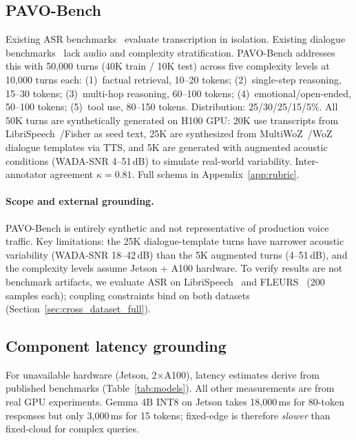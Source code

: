 \documentclass{article}
\begin{document}
\subsection{PAVO-Bench}
\label{sec:dataset}

Existing ASR benchmarks~\citep{panayotov2015librispeech,ardila2020commonvoice} evaluate transcription in isolation. Existing dialogue benchmarks~\citep{budzianowski2019multiwoz,wen2016woz} lack audio and complexity stratification. PAVO-Bench addresses this with 50{,}000 turns (40K train / 10K test) across five complexity levels at 10{,}000 turns each: (1)~factual retrieval, 10--20 tokens; (2)~single-step reasoning, 15--30 tokens; (3)~multi-hop reasoning, 60--100 tokens; (4)~emotional/open-ended, 50--100 tokens; (5)~tool use, 80--150 tokens. Distribution: 25/30/25/15/5\%. All 50K turns are synthetically generated on H100 GPU: 20K use transcripts from LibriSpeech~\citep{panayotov2015librispeech}/Fisher as seed text, 25K are synthesized from MultiWoZ~\citep{budzianowski2019multiwoz}/WoZ~\citep{wen2016woz} dialogue templates via TTS, and 5K are generated with augmented acoustic conditions (WADA-SNR 4--51\,dB) to simulate real-world variability. Inter-annotator agreement $\kappa=0.81$. Full schema in Appendix~\ref{app:rubric}.

\paragraph{Scope and external grounding.} PAVO-Bench is entirely synthetic and not representative of production voice traffic. Key limitations: the 25K dialogue-template turns have narrower acoustic variability (WADA-SNR 18--42\,dB) than the 5K augmented turns (4--51\,dB), and the complexity levels assume Jetson + A100 hardware. To verify results are not benchmark artifacts, we evaluate ASR on LibriSpeech~\citep{panayotov2015librispeech} and FLEURS~\citep{conneau2023fleurs} (200 samples each); coupling constraints bind on both datasets (Section~\ref{sec:cross_dataset_full}).

\subsection{Component latency grounding}
\label{sec:latency_ground}

For unavailable hardware (Jetson, 2$\times$A100), latency estimates derive from published benchmarks (Table~\ref{tab:models}). All other measurements are from real GPU experiments. Gemma 4B INT8 on Jetson takes 18{,}000\,ms for 80-token responses but only 3{,}000\,ms for 15 tokens; fixed-edge is therefore \emph{slower} than fixed-cloud for complex queries.
\end{document}
